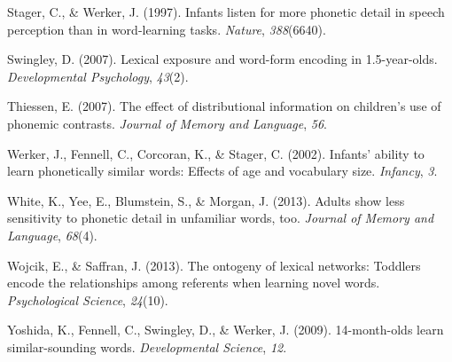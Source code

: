 \documentclass[10pt, letterpaper]{article}
\begin{document}
\hypertarget{ref-stager1997}{}
Stager, C., \& Werker, J. (1997). Infants listen for more phonetic
detail in speech perception than in word-learning tasks. \emph{Nature},
\emph{388}(6640).

\hypertarget{ref-swingley2007}{}
Swingley, D. (2007). Lexical exposure and word-form encoding in
1.5-year-olds. \emph{Developmental Psychology}, \emph{43}(2).

\hypertarget{ref-thiessen2007}{}
Thiessen, E. (2007). The effect of distributional information on
children's use of phonemic contrasts. \emph{Journal of Memory and
Language}, \emph{56}.

\hypertarget{ref-werker2002}{}
Werker, J., Fennell, C., Corcoran, K., \& Stager, C. (2002). Infants'
ability to learn phonetically similar words: Effects of age and
vocabulary size. \emph{Infancy}, \emph{3}.

\hypertarget{ref-white2013}{}
White, K., Yee, E., Blumstein, S., \& Morgan, J. (2013). Adults show
less sensitivity to phonetic detail in unfamiliar words, too.
\emph{Journal of Memory and Language}, \emph{68}(4).

\hypertarget{ref-wojcik2013}{}
Wojcik, E., \& Saffran, J. (2013). The ontogeny of lexical networks:
Toddlers encode the relationships among referents when learning novel
words. \emph{Psychological Science}, \emph{24}(10).

\hypertarget{ref-yoshida2009}{}
Yoshida, K., Fennell, C., Swingley, D., \& Werker, J. (2009).
14-month-olds learn similar-sounding words. \emph{Developmental
Science}, \emph{12}.
\end{document}
